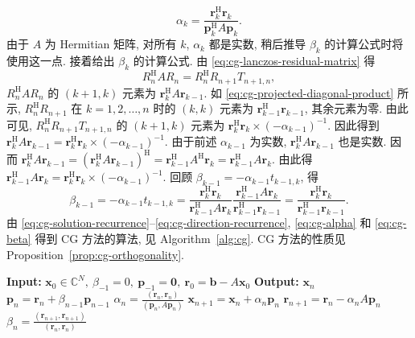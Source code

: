 \begin{equation}\label{eq:cg-alpha}\alpha_k=\frac{\bm r_k^{\mathrm H}\bm r_k}{\bm p_k^{\mathrm H}A\bm p_k}.\end{equation}
{由于 $A$ 为 Hermitian 矩阵, 对所有 $k$, $\alpha_k$ 都是实数, 稍后推导 $\beta_k$ 的计算公式时将使用这一点.}
{接着给出 $\beta_k$ 的计算公式. 由 \eqref{eq:cg-lanczos-residual-matrix} 得}
\begin{equation}\label{eq:cg-residual-projected-matrix}R_n^{\mathrm H}AR_n=R_n^{\mathrm H}R_{n+1}T_{n+1,n},\end{equation}
{$R_n^{\mathrm H}AR_n$ 的 $(k+1,k)$ 元素为 $\bm r_k^{\mathrm H}A\bm r_{k-1}$. 如 \eqref{eq:cg-projected-diagonal-product} 所示, $R_n^{\mathrm H}R_{n+1}$ 在 $k=1,2,\ldots,n$ 时的 $(k,k)$ 元素为 $\bm r_{k-1}^{\mathrm H}\bm r_{k-1}$, 其余元素为零. 由此可见, $R_n^{\mathrm H}R_{n+1}T_{n+1,n}$ 的 $(k+1,k)$ 元素为 $\bm r_k^{\mathrm H}\bm r_k\times(-\alpha_{k-1})^{-1}$. 因此得到 $\bm r_k^{\mathrm H}A\bm r_{k-1}=\bm r_k^{\mathrm H}\bm r_k\times(-\alpha_{k-1})^{-1}$. 由于前述 $\alpha_{k-1}$ 为实数, $\bm r_k^{\mathrm H}A\bm r_{k-1}$ 也是实数. 因而 $\bm r_k^{\mathrm H}A\bm r_{k-1}=(\bm r_k^{\mathrm H}A\bm r_{k-1})^{\mathrm H}=\bm r_{k-1}^{\mathrm H}A^{\mathrm H}\bm r_k=\bm r_{k-1}^{\mathrm H}A\bm r_k$. 由此得 $\bm r_{k-1}^{\mathrm H}A\bm r_k=\bm r_k^{\mathrm H}\bm r_k\times(-\alpha_{k-1})^{-1}$. 回顾 $\beta_{k-1}=-\alpha_{k-1}t_{k-1,k}$, 得}
\begin{equation}\label{eq:cg-beta}
\beta_{k-1}=-\alpha_{k-1}t_{k-1,k}=\frac{\bm r_k^{\mathrm H}\bm r_k}{\bm r_{k-1}^{\mathrm H}A\bm r_k}\frac{\bm r_{k-1}^{\mathrm H}A\bm r_k}{\bm r_{k-1}^{\mathrm H}\bm r_{k-1}}=\frac{\bm r_k^{\mathrm H}\bm r_k}{\bm r_{k-1}^{\mathrm H}\bm r_{k-1}}.
\end{equation}
{由 \eqref{eq:cg-solution-recurrence}--\eqref{eq:cg-direction-recurrence}, \eqref{eq:cg-alpha} 和 \eqref{eq:cg-beta} 得到 CG 方法的算法, 见 Algorithm\ \ref{alg:cg}. CG 方法的性质见 Proposition\ \ref{prop:cg-orthogonality}.}
\begin{algorithm}[H]\caption{{CG 方法}}\label{alg:cg}
\begin{algorithmic}[1]
\Statex\textbf{Input:} $\bm x_0\in\mathbb C^N,\ \beta_{-1}=0,\ \bm p_{-1}=\bm0,\ \bm r_0=\bm b-A\bm x_0$
\Statex\textbf{Output:} $\bm x_n$
\State $\bm p_n=\bm r_n+\beta_{n-1}\bm p_{n-1}$
\State $\alpha_n=\frac{(\bm r_n,\bm r_n)}{(\bm p_n,A\bm p_n)}$
\State $\bm x_{n+1}=\bm x_n+\alpha_n\bm p_n$
\State $\bm r_{n+1}=\bm r_n-\alpha_nA\bm p_n$
\State $\beta_n=\frac{(\bm r_{n+1},\bm r_{n+1})}{(\bm r_n,\bm r_n)}$
\EndFor\end{algorithmic}\end{algorithm}
